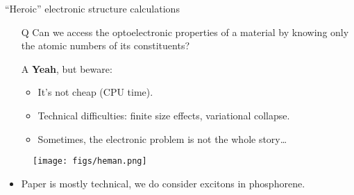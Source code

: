 \documentclass[12pt, pdf, hyperref={draft}, usenames, dvipsnames]{beamer}
\begin{document}
\begin{frame}{``Heroic'' electronic structure
calculations}
\begin{minipage}[t]{0.75\textwidth}

\begin{itemize}

  \item[Q] Can we access the optoelectronic properties of a material by knowing
  only the atomic numbers of its constituents?

\vspace{.5cm}

  \item[A] {\bf Yeah}, but beware:

  \begin{itemize}
    \item It's not cheap (CPU time).
    \item Technical difficulties: finite size effects, variational collapse.
    \item Sometimes, the electronic problem is not the whole story\ldots
  \end{itemize}

\end{itemize}


\end{minipage}%
\hfill
\begin{minipage}[t]{0.25\textwidth}

\begin{figure}[H]
  \centering
  \texttt{[image: figs/heman.png]}
\end{figure}
\end{minipage}%
\begin{itemize}
  \item Paper is mostly technical, we do consider excitons in phosphorene.
\end{itemize}
\end{frame}
\end{document}
